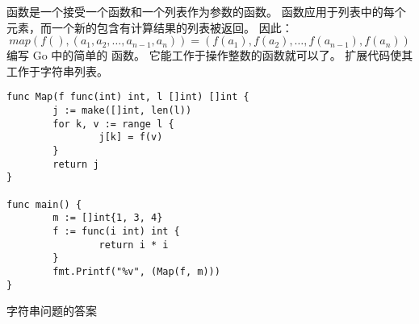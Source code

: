 \begin{Exercise}[title={Map function},difficulty=4]
\label{ex:map function}
 函数是一个接受一个函数和一个列表作为参数的函数。
函数应用于列表中的每个元素，而一个新的包含有计算结果的列表被返回。
因此： 
$$ map(f(), (a_1,a_2,\ldots,a_{n-1},a_n)) =  (f(a_1), f(a_2),\ldots,f(a_{n-1}), f(a_n)) $$
\Question \label{ex:map function q1} 编写 Go 中的简单的  函数。
它能工作于操作整数的函数就可以了。
\Question \label{ex:map function q2} 扩展代码使其工作于字符串列表。

\end{Exercise}

\begin{Answer}

\Question 
\begin{lstlisting}[caption=Map 函数]
func Map(f func(int) int, l []int) []int {
        j := make([]int, len(l))
        for k, v := range l {
                j[k] = f(v)
        }
        return j
}

func main() {
        m := []int{1, 3, 4}
        f := func(i int) int {
                return i * i
        }
        fmt.Printf("%v", (Map(f, m)))
}
\end{lstlisting}

\Question 字符串问题的答案
\end{Answer}


